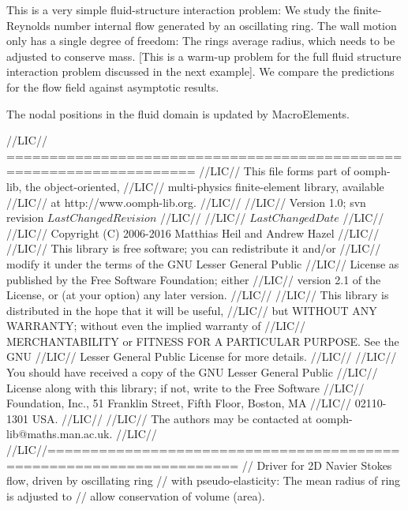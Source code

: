 This is a very simple fluid-\/structure interaction problem\+: We study the finite-\/\+Reynolds number internal flow generated by an oscillating ring. The wall motion only has a single degree of freedom\+: The ring\textquotesingle{}s average radius, which needs to be adjusted to conserve mass. \mbox{[}This is a warm-\/up problem for the full fluid structure interaction problem discussed in the next example\mbox{]}. We compare the predictions for the flow field against asymptotic results.

The nodal positions in the fluid domain is updated by {\ttfamily Macro\+Elements}.


\begin{DoxyCodeInclude}
\textcolor{comment}{//LIC// ====================================================================}
\textcolor{comment}{//LIC// This file forms part of oomph-lib, the object-oriented, }
\textcolor{comment}{//LIC// multi-physics finite-element library, available }
\textcolor{comment}{//LIC// at http://www.oomph-lib.org.}
\textcolor{comment}{//LIC// }
\textcolor{comment}{//LIC//    Version 1.0; svn revision $LastChangedRevision$}
\textcolor{comment}{//LIC//}
\textcolor{comment}{//LIC// $LastChangedDate$}
\textcolor{comment}{//LIC// }
\textcolor{comment}{//LIC// Copyright (C) 2006-2016 Matthias Heil and Andrew Hazel}
\textcolor{comment}{//LIC// }
\textcolor{comment}{//LIC// This library is free software; you can redistribute it and/or}
\textcolor{comment}{//LIC// modify it under the terms of the GNU Lesser General Public}
\textcolor{comment}{//LIC// License as published by the Free Software Foundation; either}
\textcolor{comment}{//LIC// version 2.1 of the License, or (at your option) any later version.}
\textcolor{comment}{//LIC// }
\textcolor{comment}{//LIC// This library is distributed in the hope that it will be useful,}
\textcolor{comment}{//LIC// but WITHOUT ANY WARRANTY; without even the implied warranty of}
\textcolor{comment}{//LIC// MERCHANTABILITY or FITNESS FOR A PARTICULAR PURPOSE.  See the GNU}
\textcolor{comment}{//LIC// Lesser General Public License for more details.}
\textcolor{comment}{//LIC// }
\textcolor{comment}{//LIC// You should have received a copy of the GNU Lesser General Public}
\textcolor{comment}{//LIC// License along with this library; if not, write to the Free Software}
\textcolor{comment}{//LIC// Foundation, Inc., 51 Franklin Street, Fifth Floor, Boston, MA}
\textcolor{comment}{//LIC// 02110-1301  USA.}
\textcolor{comment}{//LIC// }
\textcolor{comment}{//LIC// The authors may be contacted at oomph-lib@maths.man.ac.uk.}
\textcolor{comment}{//LIC// }
\textcolor{comment}{//LIC//====================================================================}
\textcolor{comment}{// Driver for 2D Navier Stokes flow, driven by oscillating ring}
\textcolor{comment}{// with pseudo-elasticity: The mean radius of ring is adjusted to}
\textcolor{comment}{// allow conservation of volume (area).}


\end{DoxyCodeInclude}
